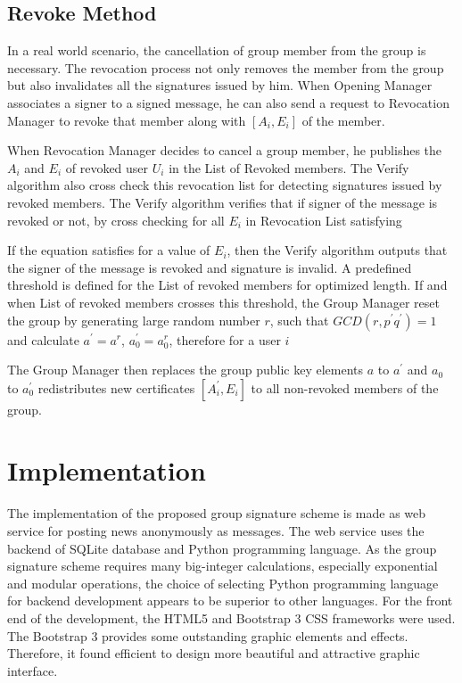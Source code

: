 \subsection{Revoke Method}\label{pro:revoke}
In a real world scenario, the cancellation of group member from the group is necessary. The revocation process not only removes the member from the group but also invalidates all the signatures issued by him. When Opening Manager associates a signer to a signed message, he can also send a request to Revocation Manager to revoke that member along with $[A_i, E_i]$ of the member.

When Revocation Manager decides to cancel a group member, he publishes the $A_i$ and $E_i$ of revoked user $U_i$ in the List of Revoked members. The Verify algorithm also cross check this revocation list for detecting signatures issued by revoked members. The Verify algorithm verifies that if signer of the message is revoked or not, by cross checking for all $E_i$ in Revocation List satisfying
\begin{center}
\end{center}

If the equation satisfies for a value of $E_i$, then the Verify algorithm outputs that the signer of the message is revoked and signature is invalid. A predefined threshold is defined for the List of revoked members for optimized length. If and when List of revoked members crosses this threshold, the Group Manager reset the group by generating large random number $r$, such that $GCD(r, p^\prime q^\prime) = 1$ and calculate $a^\prime = a^r$, $a_0^\prime = a_0^r$, therefore for a user $i$
\begin{center}
\end{center}

The Group Manager then replaces the group public key elements $a$ to $a^\prime$ and $a_0$ to $a_0^\prime$ redistributes new certificates $[A^\prime_i, E_i]$ to all  non-revoked members of the group.

\section{Implementation}
The implementation of the proposed group signature scheme is made as web service for posting news anonymously as messages. The web service uses the backend of SQLite database and Python programming language. As the group signature scheme requires many big-integer calculations, especially exponential and modular operations, the choice of selecting Python programming language for backend development appears to be superior to other languages. For the front end of the development, the HTML5 and Bootstrap 3 CSS frameworks were used. The Bootstrap 3 provides some outstanding graphic elements and effects. Therefore, it found efficient to design more beautiful and attractive graphic interface.

